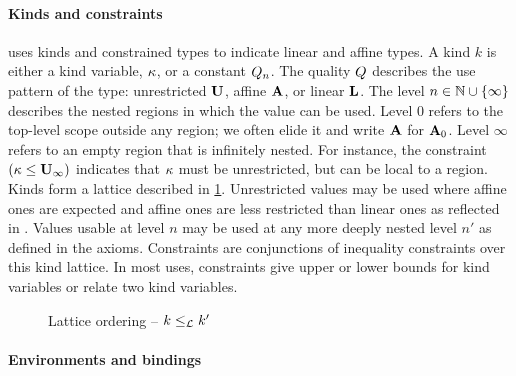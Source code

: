 \paragraph{Kinds and constraints}

\affe uses kinds and constrained types to indicate
linear and affine types.
A kind $k$ is either a kind variable, $\kappa$, or a constant $Q_n$.
The quality $Q$ describes the use pattern of the type:
unrestricted $\mathbf{U}$, affine $\mathbf{A}$, or linear $\mathbf{L}$. The level $n \in \mathbb{N} \cup \{\infty\}$
describes the nested regions in which the value can be used.
Level $0$ refers to the top-level scope outside any region; we often elide it
and write $\mathbf{A}$ for $\mathbf{A}_0$. Level
$\infty$ refers to an empty region that is infinitely nested.
For instance, the constraint $(\kappa \leq \mathbf{U}_\infty)$ indicates that
$\kappa$ must be unrestricted, but can be local to a region.
%
Kinds form a lattice described in \cref{sdtyp:lattice}.
Unrestricted values may be used
where affine ones are expected and affine ones are less restricted
than linear ones as reflected in .
Values usable at level $n$ may be used at any more deeply
nested level $n'$ as defined in the  axioms.
%
Constraints are conjunctions of inequality constraints over this kind
lattice. In most uses, constraints give upper or lower bounds for
kind variables or relate two kind variables.

\begin{figure}[tp]
  
  \vspace{-5pt}
  \caption{Lattice ordering -- $k \leq_\mathcal L k'$}
  \label{sdtyp:lattice}
  \vspace{-10pt}
\end{figure}

\paragraph{Environments and bindings}
\label{sdtyping:envs}


